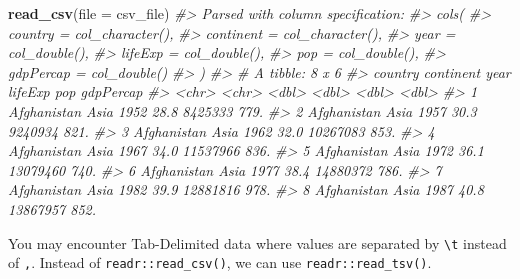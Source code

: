 \documentclass[
]{report}
\newenvironment{Shaded}{\begin{snugshade}}{\end{snugshade}}
\newcommand{\CommentTok}[1]{\textcolor[rgb]{0.56,0.35,0.01}{\textit{#1}}}
\newcommand{\DataTypeTok}[1]{\textcolor[rgb]{0.13,0.29,0.53}{#1}}
\newcommand{\KeywordTok}[1]{\textcolor[rgb]{0.13,0.29,0.53}{\textbf{#1}}}
\newcommand{\NormalTok}[1]{#1}
\begin{document}
\begin{Shaded}
\begin{Highlighting}[]
\KeywordTok{read\_csv}\NormalTok{(}\DataTypeTok{file =}\NormalTok{ csv\_file)}
\CommentTok{\#\textgreater{} Parsed with column specification:}
\CommentTok{\#\textgreater{} cols(}
\CommentTok{\#\textgreater{}   country = col\_character(),}
\CommentTok{\#\textgreater{}   continent = col\_character(),}
\CommentTok{\#\textgreater{}   year = col\_double(),}
\CommentTok{\#\textgreater{}   lifeExp = col\_double(),}
\CommentTok{\#\textgreater{}   pop = col\_double(),}
\CommentTok{\#\textgreater{}   gdpPercap = col\_double()}
\CommentTok{\#\textgreater{} )}
\CommentTok{\#\textgreater{} \# A tibble: 8 x 6}
\CommentTok{\#\textgreater{}   country     continent  year lifeExp      pop gdpPercap}
\CommentTok{\#\textgreater{}   \textless{}chr\textgreater{}       \textless{}chr\textgreater{}     \textless{}dbl\textgreater{}   \textless{}dbl\textgreater{}    \textless{}dbl\textgreater{}     \textless{}dbl\textgreater{}}
\CommentTok{\#\textgreater{} 1 Afghanistan Asia       1952    28.8  8425333      779.}
\CommentTok{\#\textgreater{} 2 Afghanistan Asia       1957    30.3  9240934      821.}
\CommentTok{\#\textgreater{} 3 Afghanistan Asia       1962    32.0 10267083      853.}
\CommentTok{\#\textgreater{} 4 Afghanistan Asia       1967    34.0 11537966      836.}
\CommentTok{\#\textgreater{} 5 Afghanistan Asia       1972    36.1 13079460      740.}
\CommentTok{\#\textgreater{} 6 Afghanistan Asia       1977    38.4 14880372      786.}
\CommentTok{\#\textgreater{} 7 Afghanistan Asia       1982    39.9 12881816      978.}
\CommentTok{\#\textgreater{} 8 Afghanistan Asia       1987    40.8 13867957      852.}
\end{Highlighting}
\end{Shaded}

You may encounter Tab-Delimited data where values are separated by \texttt{\textbackslash{}t} instead of \texttt{,}. Instead of \texttt{readr::read\_csv()}, we can use \texttt{readr::read\_tsv()}.
\end{document}
